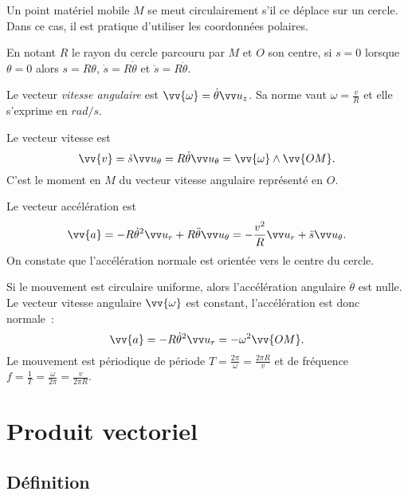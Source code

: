     

Un point matériel mobile $M$ se meut circulairement s'il ce déplace sur un cercle. Dans ce cas, il est pratique d'utiliser les coordonnées polaires.

En notant $R$ le rayon du cercle parcouru par $M$ et $O$ son centre, si $s=0$ lorsque $\theta=0$ alors $s=R\theta$, $\dot{s}=R\dot{\theta}$ et $\ddot{s}=R\ddot{\theta}$.

Le vecteur \emph{vitesse angulaire} est $\vv{\omega}=\dot{\theta}\uz$. Sa norme vaut $\omega=\frac{v}{R}$ et elle s'exprime en $\si{rad\per s}$. 

Le vecteur vitesse est 
\begin{equation}
 \vv{v}=\dot{s}\utheta=R\dot{\theta} \utheta= \vv{\omega} \wedge \vv{OM}.
\end{equation}
C'est le moment en $M$ du vecteur vitesse angulaire représenté en $O$.

Le vecteur accélération est
\begin{equation}
\vv{a}=-R\dot{\theta}^2\ur +R\ddot{\theta}\utheta=-\frac{v^2}{R}\ur+\ddot{s}\utheta.  
\end{equation}
On constate que l'accélération normale est orientée vers le centre du cercle.

Si le mouvement est circulaire uniforme, alors l'accélération angulaire $\ddot{\theta}$ est nulle. Le vecteur vitesse angulaire $\vv{\omega}$ est constant, l'accélération est donc normale~:
\begin{equation}
  \vv{a}=-R\dot{\theta}^2\ur =-\omega^2\vv{OM}.
\end{equation}
Le mouvement est périodique de période $T=\frac{2\pi}{\omega}=\frac{2\pi R}{v}$ et de fréquence $f=\frac{1}{T}=\frac{\omega}{2\pi}=\frac{v}{2\pi R}$.

\section{Produit vectoriel}
\label{chap1-sec:produitvectoriel}

\subsection{Définition}
\label{chap1-subsec:defprodvec}

